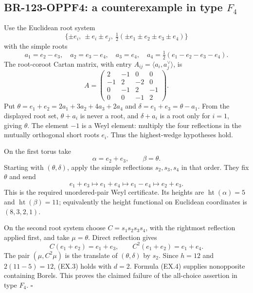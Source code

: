 \documentclass[11pt,a4paper]{article}
\theoremstyle{definition}\newtheorem{definition}[theorem]{Definition}
\theoremstyle{remark}\newtheorem{remark}[theorem]{Remark}
\begin{document}
\subsection{BR-123-OPPF4: a counterexample in type \texorpdfstring{$F_4$}{F4}}
Use the Euclidean root system
\[
 \{\pm e_i,\ \pm e_i\pm e_j,\
             \tfrac12(\pm e_1\pm e_2\pm e_3\pm e_4)\}
\]
with the simple roots
\[
 a_1=e_2-e_3,\quad a_2=e_3-e_4,\quad a_3=e_4,\quad
 a_4=\tfrac12(e_1-e_2-e_3-e_4).
 \tag{EX.5}
\]
The root-coroot Cartan matrix, with entry
$A_{ij}=\langle a_i,a_j^\vee\rangle$, is
\[
 A=\begin{pmatrix}
 2&-1&0&0\\-1&2&-2&0\\0&-1&2&-1\\0&0&-1&2
 \end{pmatrix}.
\]
Put $\theta=e_1+e_2=2a_1+3a_2+4a_3+2a_4$ and
$\delta=e_1+e_3=\theta-a_1$.  From the displayed root set,
$\theta+a_i$ is never a root, and $\delta+a_i$ is a root only
for $i=1$, giving $\theta$.  The element $-1$ is a Weyl element:
multiply the four reflections in the mutually orthogonal short
roots $e_i$.  Thus the highest-wedge hypotheses hold.

On the first torus take
\[
                 \alpha=e_2+e_3,
                 \qquad\beta=\theta.
\]
Starting with $(\theta,\delta)$, apply the simple reflections
$s_2,s_3,s_4$ in that order.  They fix $\theta$ and send
\[
 e_1+e_3\longmapsto e_1+e_4
       \longmapsto e_1-e_4\longmapsto e_2+e_3.
\]
This is the required unordered-pair Weyl certificate.  Its heights
are $\operatorname{ht}(\alpha)=5$ and
$\operatorname{ht}(\beta)=11$; equivalently the height functional
on Euclidean coordinates is $(8,3,2,1)$.

On the second root system choose $C=s_1s_2s_3s_4$, with the rightmost
reflection applied first, and take $\mu=\theta$.  Direct reflection
gives
\[
 C(e_1+e_2)=e_1+e_3,\qquad C^2(e_1+e_2)=e_1+e_4.
\]
The pair $(\mu,C^2\mu)$ is the translate of
$(\theta,\delta)$ by $s_2$.  Since $h=12$ and
$2(11-5)=12$, (EX.3) holds with $d=2$.  Formula (EX.4) supplies
nonopposite containing Borels.  This proves the claimed failure
of the all-choice assertion in type $F_4$.  $\square$
\end{document}
